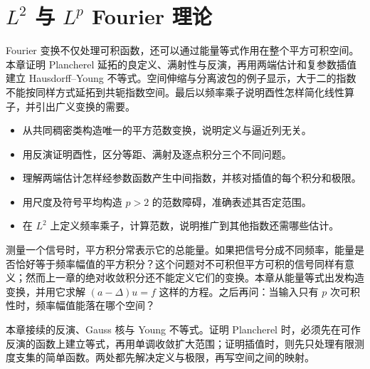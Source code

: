 \chapter{\texorpdfstring{\(L^2\)}{L²} 与 \texorpdfstring{\(L^p\)}{Lᵖ} Fourier 理论}
\label{b2:ch:04}
\begin{chapterabstract}
Fourier 变换不仅处理可积函数，还可以通过能量等式作用在整个平方可积空间。本章证明 Plancherel 延拓的良定义、满射性与反演，再用两端估计和复参数插值建立 Hausdorff--Young 不等式。空间伸缩与分离波包的例子显示，大于二的指数不能按同样方式延拓到共轭指数空间。最后以频率乘子说明酉性怎样简化线性算子，并引出广义变换的需要。
\end{chapterabstract}
\begin{learninggoals}
\begin{itemize}
\item\label{b2:item:04-goal-extension}从共同稠密类构造唯一的平方范数变换，说明定义与逼近列无关。
\item\label{b2:item:04-goal-unitary}用反演证明酉性，区分等距、满射及逐点积分三个不同问题。
\item\label{b2:item:04-goal-interpolation}理解两端估计怎样经参数函数产生中间指数，并核对插值的每个积分和极限。
\item\label{b2:item:04-goal-failure}用尺度及符号平均构造 \(p>2\) 的范数障碍，准确表述其否定范围。
\item\label{b2:item:04-goal-multiplier}在 \(L^2\) 上定义频率乘子，计算范数，说明推广到其他指数还需哪些估计。
\end{itemize}
\end{learninggoals}

测量一个信号时，平方积分常表示它的总能量。如果把信号分成不同频率，能量是否恰好等于频率幅值的平方积分？这个问题对不可积但平方可积的信号同样有意义；然而上一章的绝对收敛积分还不能定义它们的变换。本章从能量等式出发构造变换，并用它求解 \((a-\Delta)u=f\) 这样的方程。之后再问：当输入只有 \(p\) 次可积性时，频率幅值能落在哪个空间？

\ProseParagraphBreak

本章接续的反演、Gauss 核与 Young 不等式。证明 Plancherel 时，必须先在可作反演的函数上建立等式，再用单调收敛扩大范围；证明插值时，则先只处理有限测度支集的简单函数。两处都先解决定义与极限，再写空间之间的映射。

\ProseParagraphBreak

